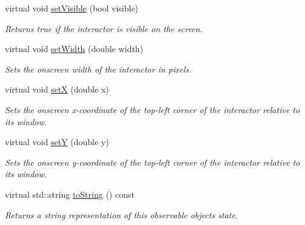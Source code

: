 \begin{DoxyCompactItemize}
virtual void \mbox{\hyperlink{classsgl_1_1GInteractor_a18e44e30b31525a243960ca3928125aa}{set\+Visible}} (bool visible)
\begin{DoxyCompactList}\small\item\em Returns true if the interactor is visible on the screen. \end{DoxyCompactList}\item 
virtual void \mbox{\hyperlink{classsgl_1_1GInteractor_aa3f3fba4cb131baa8696ba01e3bceca1}{set\+Width}} (double width)
\begin{DoxyCompactList}\small\item\em Sets the onscreen width of the interactor in pixels. \end{DoxyCompactList}\item 
virtual void \mbox{\hyperlink{classsgl_1_1GInteractor_a9c18fcc579333bf9653d13ad2b372e39}{setX}} (double x)
\begin{DoxyCompactList}\small\item\em Sets the onscreen x-\/coordinate of the top-\/left corner of the interactor relative to its window. \end{DoxyCompactList}\item 
virtual void \mbox{\hyperlink{classsgl_1_1GInteractor_a7d57e2a5c35d27feb58fd498a3cf82b9}{setY}} (double y)
\begin{DoxyCompactList}\small\item\em Sets the onscreen y-\/coordinate of the top-\/left corner of the interactor relative to its window. \end{DoxyCompactList}\item 
virtual std\+::string \mbox{\hyperlink{classsgl_1_1GObservable_a1fe5121d6528fdea3f243321b3fa3a49}{to\+String}} () const
\begin{DoxyCompactList}\small\item\em Returns a string representation of this observable object\textquotesingle{}s state. \end{DoxyCompactList}\end{DoxyCompactItemize}
